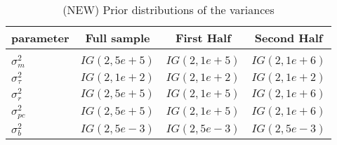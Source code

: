 \documentclass[12pt,reqno,oneside]{amsart}
\theoremstyle{definition}
\theoremstyle{remark}
\begin{document}
\begin{table}[b]
\caption{(NEW) Prior distributions of the variances}\label{tbl:prior3}
\begin{tabular}{lccc}
\hline
parameter           & Full sample      & First Half   & Second Half \\
\hline \\
$\sigma^2_m$        & $IG(2,5e+5)$     & $IG(2,1e+5)$          & $IG(2,1e+6)$       \\
$\sigma^2_\tau$     & $IG(2,1e+2)$     & $IG(2,1e+2)$          & $IG(2,1e+2)$       \\
$\sigma^2_r$        & $IG(2,5e+5)$     & $IG(2,1e+5)$          & $IG(2,1e+6)$       \\
$\sigma^2_{pc}$     & $IG(2,5e+5)$     & $IG(2,1e+5)$          & $IG(2,1e+6)$       \\
$\sigma^2_{b}$      & $IG(2,5e-3)$     & $IG(2,5e-3)$          & $IG(2,5e-3)$       \\
\hline
\end{tabular}
\end{table}
\end{document}
